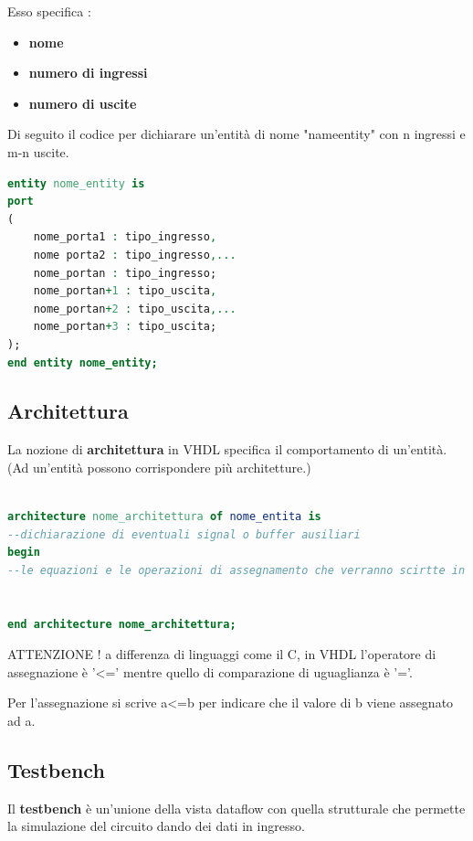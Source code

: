 \documentclass[a4paper]{book}
\begin{document}
Esso specifica :
\begin{itemize}
\item \textbf{nome}
\item \textbf{numero di ingressi}
\item \textbf{numero di uscite}

\end{itemize}

Di seguito il codice per dichiarare un'entità di nome "name\textunderscore entity" con n ingressi e m-n uscite.

\begin{lstlisting}[language=VHDL]
entity nome_entity is
port
(	
	nome_porta1 : tipo_ingresso,
	nome porta2 : tipo_ingresso,...
	nome_portan : tipo_ingresso;
	nome_portan+1 : tipo_uscita,
	nome_portan+2 : tipo_uscita,...
	nome_portan+3 : tipo_uscita;
);
end entity nome_entity;
\end{lstlisting}

\subsection{Architettura}

La nozione di \textbf{architettura} in VHDL specifica il comportamento di un'entità.
(Ad un'entità possono corrispondere più architetture.)

\begin{lstlisting}[language=VHDL]

architecture nome_architettura of nome_entita is
--dichiarazione di eventuali signal o buffer ausiliari
begin
--le equazioni e le operazioni di assegnamento che verranno scirtte in questa zona verranno eseguite tutte in contemporanea, indipendentemente dalla sequenza in cui compariranno


end architecture nome_architettura;


\end{lstlisting}

ATTENZIONE ! a differenza di linguaggi come il C, in VHDL l'operatore di assegnazione è '<=' mentre quello di comparazione di uguaglianza è '='.

Per l'assegnazione si scrive a<=b per indicare che il valore di b viene assegnato ad a.

\subsection{Testbench}

Il \textbf{testbench} è un'unione della vista dataflow con quella strutturale che permette la simulazione del circuito dando dei dati in ingresso.
\end{document}
